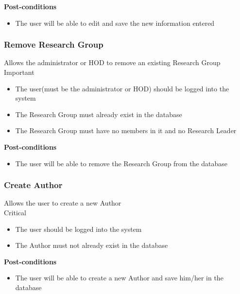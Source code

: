 \documentclass[a4paper]{article}
\begin{document}
	\textbf{Post-conditions}
	 \begin{itemize}
		\item The user will be able to edit and save the new information entered
	\end{itemize}
	
	\subsubsection{Remove Research Group}
	 Allows the administrator or HOD to remove an existing Research Group\\
	 Important\\
	
	 \begin{itemize}
		\item The user(must be the administrator or HOD) should be logged into the system
		\item The Research Group must already exist in the database
		\item The Research Group must have no members in it and no Research Leader
	\end{itemize}
	
	\textbf{Post-conditions}
	 \begin{itemize}
		\item The user will be able to remove the Research Group from the database
	\end{itemize}
	
	\subsubsection{Create Author}
	 Allows the user to create a new Author\\
	 Critical\\
	
	 \begin{itemize}
		\item The user should be logged into the system
		\item The Author must not already exist in the database
	\end{itemize}
	
	\textbf{Post-conditions}
	 \begin{itemize}
		\item The user will be able to create a new Author and save him/her in the database
	\end{itemize}
	
\end{document}
